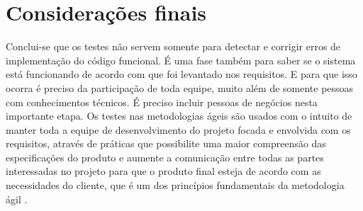 \chapter{Considerações finais}\label{CAP:3}

Conclui-se que os testes não servem somente para detectar e corrigir erros  de  implementação do código funcional. É uma fase também para saber se o sistema está funcionando de acordo com que foi levantado nos requisitos. E para que isso ocorra é preciso da participação de toda equipe, muito além de somente pessoas com conhecimentos técnicos. É preciso incluir pessoas de negócios nesta importante etapa. Os testes nas metodologias ágeis são usados com o intuito de manter toda a equipe de desenvolvimento do projeto focada e envolvida com os requisitos, através de práticas que possibilite uma maior compreensão das especificações do produto e aumente a comunicação entre todas as partes interessadas no projeto para que o produto final esteja de acordo com as necessidades do cliente, que é um dos princípios fundamentais da metodologia ágil .
